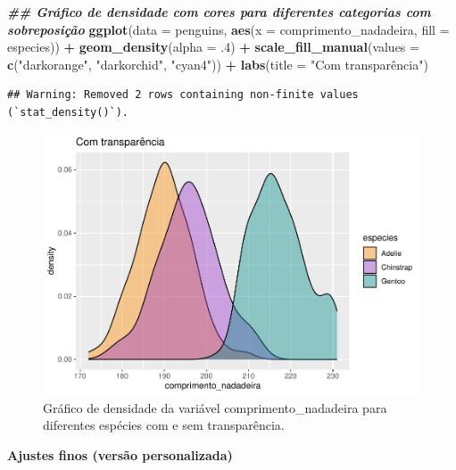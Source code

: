 \documentclass[
]{article}
\newenvironment{Shaded}{\begin{snugshade}}{\end{snugshade}}
\newcommand{\AttributeTok}[1]{\textcolor[rgb]{0.13,0.29,0.53}{#1}}
\newcommand{\DecValTok}[1]{\textcolor[rgb]{0.00,0.00,0.81}{#1}}
\newcommand{\DocumentationTok}[1]{\textcolor[rgb]{0.56,0.35,0.01}{\textbf{\textit{#1}}}}
\newcommand{\FunctionTok}[1]{\textcolor[rgb]{0.13,0.29,0.53}{\textbf{#1}}}
\newcommand{\NormalTok}[1]{#1}
\newcommand{\SpecialCharTok}[1]{\textcolor[rgb]{0.81,0.36,0.00}{\textbf{#1}}}
\newcommand{\StringTok}[1]{\textcolor[rgb]{0.31,0.60,0.02}{#1}}
\begin{document}
\begin{Shaded}
\begin{Highlighting}[]
\DocumentationTok{\#\# Gráfico de densidade com cores para diferentes categorias com sobreposição}
\FunctionTok{ggplot}\NormalTok{(}\AttributeTok{data =}\NormalTok{ penguins, }\FunctionTok{aes}\NormalTok{(}\AttributeTok{x =}\NormalTok{ comprimento\_nadadeira, }\AttributeTok{fill =}\NormalTok{ especies)) }\SpecialCharTok{+}
    \FunctionTok{geom\_density}\NormalTok{(}\AttributeTok{alpha =}\NormalTok{ .}\DecValTok{4}\NormalTok{) }\SpecialCharTok{+}
    \FunctionTok{scale\_fill\_manual}\NormalTok{(}\AttributeTok{values =} \FunctionTok{c}\NormalTok{(}\StringTok{"darkorange"}\NormalTok{, }\StringTok{"darkorchid"}\NormalTok{, }\StringTok{"cyan4"}\NormalTok{)) }\SpecialCharTok{+}
    \FunctionTok{labs}\NormalTok{(}\AttributeTok{title =} \StringTok{"Com transparência"}\NormalTok{)}
\end{Highlighting}
\end{Shaded}

\begin{verbatim}
## Warning: Removed 2 rows containing non-finite values (`stat_density()`).
\end{verbatim}

\begin{figure}
\includegraphics[width=0.75\linewidth,height=0.75\textheight]{epr_files/figure-latex/fig-dens-flipper-cat-2} \caption{Gráfico de densidade da variável comprimento_nadadeira para diferentes espécies com e sem transparência.}\label{fig:fig-dens-flipper-cat-2}
\end{figure}

\textbf{Ajustes finos (versão personalizada)}
\end{document}

